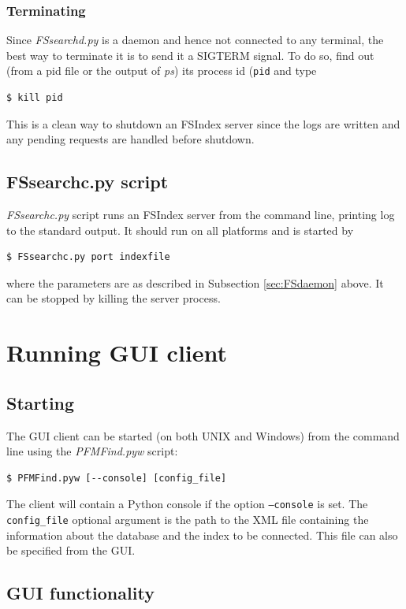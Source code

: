 \documentclass[10pt,letter]{article}
\begin{document}
\subsubsection{Terminating}

Since \textit{FSsearchd.py} is a daemon and hence not connected to any terminal, the best way to terminate it is to send it a SIGTERM signal. To do so, find out (from a pid file or the output of \textit{ps}) its process id (\texttt{pid} and type
\begin{verbatim}
$ kill pid 
\end{verbatim}
This is a clean way to shutdown an FSIndex server since the logs are written and any pending requests are handled before shutdown.

\subsection{FSsearchc.py script}\label{sec:FSscript}

\textit{FSsearchc.py} script runs an FSIndex server from the command line, printing log to the standard output. It should run on all platforms and is started by 
\begin{verbatim}
$ FSsearchc.py port indexfile
\end{verbatim}
where the parameters are as described in Subsection \ref{sec:FSdaemon} above. It can be stopped by killing the server process.

\section{Running GUI client}

\subsection{Starting}

The GUI client can be started (on both UNIX and Windows) from the command line using the \textit{PFMFind.pyw} script:
\begin{verbatim}
$ PFMFind.pyw [--console] [config_file]
\end{verbatim}

The client will contain a Python console if the option \texttt{--console} is set. The \texttt{config\_file} optional argument is the path to the XML file containing the information about the database and the index to be connected. This file can also be specified from the GUI.

\subsection{GUI functionality}
\end{document}
